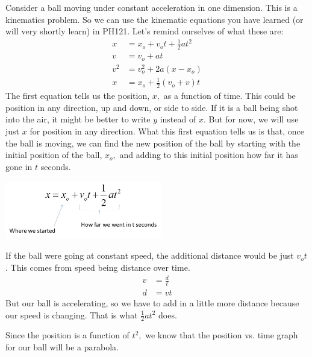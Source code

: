 \documentclass{book}
\begin{document}
Consider a ball moving under constant acceleration in one dimension. This is a
kinematics problem. So we can use the kinematic equations you have learned (or
will very shortly learn) in PH121. Let's remind ourselves of what these are: 
\begin{align*}
x  & =x_{o}+v_{o}t+\frac{1}{2}at^{2}\\
v  & =v_{o}+at\\
v^{2}  & =v_{o}^{2}+2a\left(  x-x_{o}\right) \\
x  & =x_{o}+\frac{1}{2}\left(  v_{o}+v\right)  t
\end{align*}
The first equation tells us the position, $x,$ as a function of time. This
could be position in any direction, up and down, or side to side. If it is a
ball being shot into the air, it might be better to write $y$ instead of $x.$
But for now, we will use just $x$ for position in any direction. What this
first equation tells us is that, once the ball is moving, we can find the new
position of the ball by starting with the initial position of the ball,
$x_{o},$ and adding to this initial position how far it has gone in $t$
seconds.
\begin{center}
\includegraphics[natheight=1.308300in,natwidth=3.587800in,height=0.9943in,width=2.6911in]{Lab7_figs/kinematicsAnnotated.png} \end{center}
If the ball were going at constant speed, the additional distance would be
just $v_{o}t$. This comes from speed being distance over time.
\begin{align*}
v  & =\frac{d}{t}\\
d  & =vt
\end{align*}
But our ball is accelerating, so we have to add in a little more distance
because our speed is changing. That is what $\frac{1}{2}at^{2}$ does. 


Since the position is a function of $t^{2},$ we know that the position vs.
time graph for our ball will be a parabola.
\end{document}
